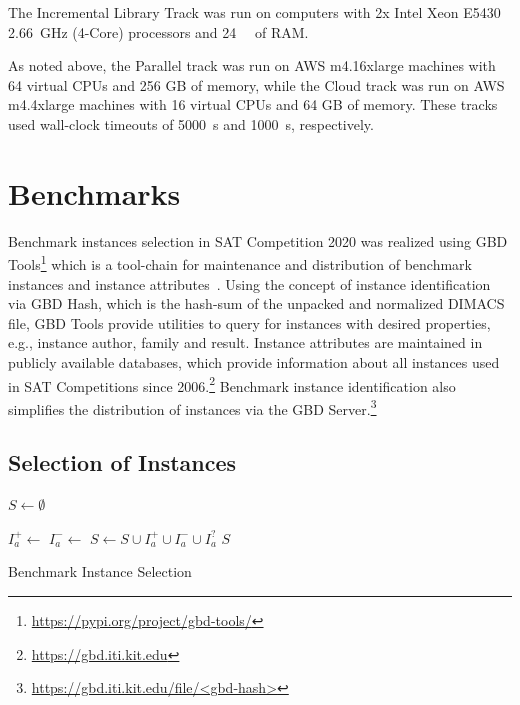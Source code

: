 \documentclass{elsarticle}
\begin{document}
The Incremental Library Track was run on computers with 2x Intel Xeon E5430 \SI{2.66}{\giga\hertz}
(4-Core) processors and \SI{24}{\giga\byte} of RAM.

As noted above, the Parallel track was run on AWS m4.16xlarge machines with 64 virtual CPUs and 256 GB
of memory, while the Cloud track was run on AWS m4.4xlarge machines with 16 virtual CPUs and 64 GB of
memory. These tracks used wall-clock timeouts of \SI{5000}{\second} and \SI{1000}{\second}, respectively.

\section{Benchmarks}
\label{sec:instances}

Benchmark instances selection in SAT Competition  2020 was realized using GBD Tools\footnote{\url{https://pypi.org/project/gbd-tools/}} which is a tool-chain for maintenance and distribution of benchmark instances and instance attributes~\cite{Iser:2018:GBD}.
Using the concept of instance identification via GBD Hash, which is the hash-sum of the unpacked and normalized DIMACS file, GBD Tools provide utilities to query for instances with desired properties, e.g., instance author, family and result.
Instance attributes are maintained in publicly available databases, which provide information about all instances used in SAT Competitions since 2006.\footnote{\url{https://gbd.iti.kit.edu}} 
Benchmark instance identification also simplifies the distribution of instances via the GBD Server.\footnote{\url{https://gbd.iti.kit.edu/file/<gbd-hash>}}


\subsection{Selection of Instances}
\label{sec:byob}

\begin{algorithm}[t]
\DontPrintSemicolon
\small
{}
\BlankLine
$S \leftarrow \emptyset$\;

 {
	$I_a^+ \leftarrow$ \;	
	$I_a^- \leftarrow$ \;	
	$S \leftarrow S \cup I_a^+ \cup I_a^- \cup I_a^?$\;	
}
\Return $S$\;

\caption{Benchmark Instance Selection}
\label{algo:select}
\end{algorithm}
\end{document}
